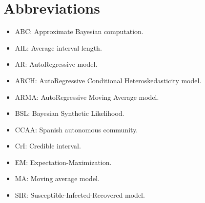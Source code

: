 \documentclass{bmcart}
\begin{document}
\section*{Abbreviations}
\begin{itemize}
 \item ABC: Approximate Bayesian computation.
 \item AIL: Average interval length.
 \item AR: AutoRegressive model.
 \item ARCH: AutoRegressive Conditional Heteroskedasticity model.
 \item ARMA: AutoRegressive Moving Average model.
 \item BSL: Bayesian Synthetic Likelihood.
 \item CCAA: Spanish autonomous community.
 \item CrI: Credible interval.
 \item EM: Expectation-Maximization.
 \item MA: Moving average model.
 \item SIR: Susceptible-Infected-Recovered model.
\end{itemize}

\end{document}
